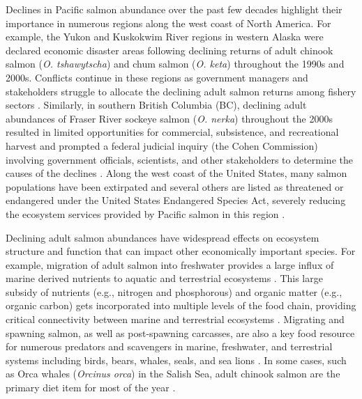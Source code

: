 Declines in Pacific salmon abundance over the past few decades highlight their
importance in numerous regions along the west coast of North America. For
example, the Yukon and Kuskokwim River regions in western Alaska were declared
economic disaster areas following declining returns of adult chinook salmon
(\emph{O. tshawytscha}) and chum salmon (\emph{O. keta}) throughout the 1990s
and 2000s. Conflicts continue in these regions as government managers and
stakeholders struggle to allocate the declining adult salmon returns among
fishery sectors \citep{Ebbin2002, Ebbin2003}. Similarly, in southern British
Columbia (BC), declining adult abundances of Fraser River sockeye salmon
(\emph{O. nerka}) throughout the 2000s resulted in limited opportunities for
commercial, subsistence, and recreational harvest and prompted a federal
judicial inquiry (the Cohen Commission) involving government officials,
scientists, and other stakeholders to determine the causes of the declines
\citep{Cohen2012}. Along the west coast of the United States, many salmon
populations have been extirpated and several others are listed as threatened or
endangered under the United States Endangered Species Act, severely reducing the
ecosystem services provided by Pacific salmon in this region \citep{Nehlsen1991,
NMFS2015, Williams2011b}.

Declining adult salmon abundances have widespread effects on ecosystem structure
and function that can impact other economically important species. For example,
migration of adult salmon into freshwater provides a large influx of marine
derived nutrients to aquatic and terrestrial ecosystems \citep{Claeson2006,
Johnston2004, Chaloner2002}. This large subsidy of nutrients (e.g., nitrogen and
phosphorous) and organic matter (e.g., organic carbon) gets incorporated into
multiple levels of the food chain, providing critical connectivity between
marine and terrestrial ecosystems \citep{Claeson2006, Johnston2004}. Migrating
and spawning salmon, as well as post-spawning carcasses, are also a key food
resource for numerous predators and scavengers in marine, freshwater, and
terrestrial systems including birds, bears, whales, seals, and sea lions
\citep{Ford2016, Olesiuk1993a, Trites2007a, Hilderbrand1999b}. In some cases,
such as Orca whales (\emph{Orcinus orca}) in the Salish Sea, adult chinook
salmon are the primary diet item for most of the year \citep{Ford2016}.

